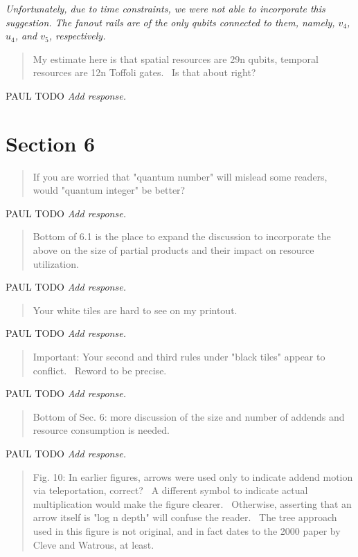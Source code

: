 \documentclass{article}
\theoremstyle{plain} \newtheorem{lemma}{Lemma}
\begin{document}
{\it Unfortunately, due to time constraints, we were not able to incorporate this suggestion.
The fanout rails are of the only qubits connected to them, namely, $v_4$, $u_4$, and $v_5$, respectively.}

\begin{quote}
My estimate here is that spatial resources are 29n qubits, temporal
resources are 12n Toffoli gates.  Is that about right?
\end{quote}

PAUL TODO
{\it Add response.}

\section{Section 6}

\begin{quote}
If you are worried that "quantum number" will mislead some readers,
would "quantum integer" be better?
\end{quote}

PAUL TODO
{\it Add response.}

\begin{quote}
Bottom of 6.1 is the place to expand the discussion to incorporate the
above on the size of partial products and their impact on resource
utilization.
\end{quote}

PAUL TODO
{\it Add response.}

\begin{quote}
Your white tiles are hard to see on my printout.
\end{quote}

PAUL TODO
{\it Add response.}

\begin{quote}
Important: Your second and third rules under "black tiles" appear to
conflict.  Reword to be precise.
\end{quote}

PAUL TODO
{\it Add response.}

\begin{quote}
Bottom of Sec. 6: more discussion of the size and number of addends
and resource consumption is needed.
\end{quote}

PAUL TODO
{\it Add response.}

\begin{quote}
Fig. 10: In earlier figures, arrows were used only to indicate addend
motion via teleportation, correct?  A different symbol to indicate
actual multiplication would make the figure clearer.  Otherwise,
asserting that an arrow itself is "log n depth" will confuse the
reader.  The tree approach used in this figure is not original, and in
fact dates to the 2000 paper by Cleve and Watrous, at least.
\end{quote}
\end{document}
